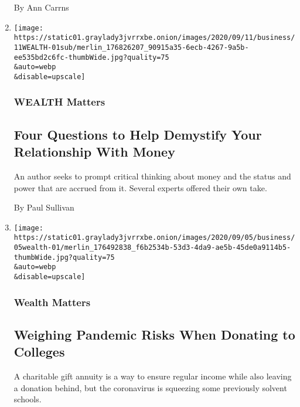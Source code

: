 \begin{enumerate}
  By Ann Carrns
\item
  \href{/2020/09/11/your-money/four-questions-money.html}{}

  \texttt{[image: https://static01.graylady3jvrrxbe.onion/images/2020/09/11/business/11WEALTH-01sub/merlin\_176826207\_90915a35-6ecb-4267-9a5b-ee535bd2c6fc-thumbWide.jpg?quality=75\\\&auto=webp\\\&disable=upscale]}

  \hypertarget{wealth-matters}{%
  \subsubsection{WEALTH Matters}\label{wealth-matters}}

  \hypertarget{four-questions-to-help-demystify-your-relationship-with-money}{%
  \subsection{Four Questions to Help Demystify Your Relationship With
  Money}\label{four-questions-to-help-demystify-your-relationship-with-money}}

  An author seeks to prompt critical thinking about money and the status
  and power that are accrued from it. Several experts offered their own
  take.

  By Paul Sullivan
\item
  \href{/2020/09/04/your-money/charitable-gift-annuities-colleges-covid19.html}{}

  \texttt{[image: https://static01.graylady3jvrrxbe.onion/images/2020/09/05/business/05wealth-01/merlin\_176492838\_f6b2534b-53d3-4da9-ae5b-45de0a9114b5-thumbWide.jpg?quality=75\\\&auto=webp\\\&disable=upscale]}

  \hypertarget{wealth-matters-1}{%
  \subsubsection{Wealth Matters}\label{wealth-matters-1}}

  \hypertarget{weighing-pandemic-risks-when-donating-to-colleges}{%
  \subsection{Weighing Pandemic Risks When Donating to
  Colleges}\label{weighing-pandemic-risks-when-donating-to-colleges}}

  A charitable gift annuity is a way to ensure regular income while also
  leaving a donation behind, but the coronavirus is squeezing some
  previously solvent schools.


\end{enumerate}
